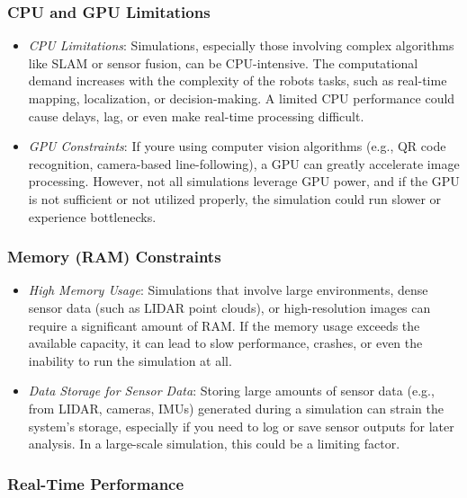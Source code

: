\documentclass[../../main]{subfiles}
\begin{document}
    \subsubsection{CPU and GPU Limitations}

    \begin{itemize}
    \item
      \emph{CPU Limitations}: Simulations, especially those involving
      complex algorithms like SLAM or sensor fusion, can be CPU-intensive.
      The computational demand increases with the complexity of the
      robot\textquotesingle s tasks, such as real-time mapping,
      localization, or decision-making. A limited CPU performance could
      cause delays, lag, or even make real-time processing difficult.
    \item
      \emph{GPU Constraints}: If you\textquotesingle re using computer
      vision algorithms (e.g., QR code recognition, camera-based
      line-following), a GPU can greatly accelerate image processing.
      However, not all simulations leverage GPU power, and if the GPU is not
      sufficient or not utilized properly, the simulation could run slower
      or experience bottlenecks.
    \end{itemize}
    
    \subsubsection{Memory (RAM) Constraints}   
    \begin{itemize}
    \item
      \emph{High Memory Usage}: Simulations that involve large
      environments, dense sensor data (such as LIDAR point clouds), or
      high-resolution images can require a significant amount of RAM. If the
      memory usage exceeds the available capacity, it can lead to slow
      performance, crashes, or even the inability to run the simulation at
      all.
    \item
      \emph{Data Storage for Sensor Data}: Storing large amounts of sensor
      data (e.g., from LIDAR, cameras, IMUs) generated during a simulation
      can strain the system's storage, especially if you need to log or save
      sensor outputs for later analysis. In a large-scale simulation, this
      could be a limiting factor.
    \end{itemize}
    
    \subsubsection{Real-Time Performance}
    
\end{document}
